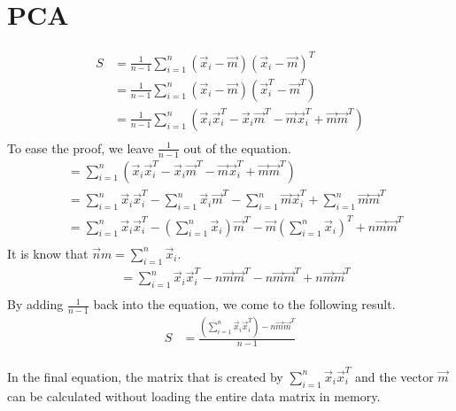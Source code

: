 \documentclass[a4paper,12px]{article}
\begin{document}
\section{PCA}

\begin{equation}
\begin{aligned}
S &= \frac{1}{n-1} \sum\limits_{i=1}^{n} (\vec x_i - \vec m)(\vec x_i - \vec m)^T\\
  &= \frac{1}{n-1} \sum\limits_{i=1}^{n} (\vec x_i - \vec m)(\vec x_i^T - \vec m^T)\\
  &= \frac{1}{n-1} \sum\limits^n_{i=1} \left(\vec x_i \vec x_i^T - \vec x_i \vec m^T -
                                             \vec m \vec x_i^T + \vec m \vec m ^T\right) \\
\end{aligned}
\end{equation}
To ease the proof, we leave $\frac{1}{n-1}$ out of the equation.
\begin{equation}
\begin{aligned}
  &= \sum\limits^n_{i=1} \left(\vec x_i \vec x_i^T - \vec x_i \vec m^T - \vec m \vec
    x_i^T + \vec m \vec m^T\right)\\
  &= \sum\limits^n_{i=1} \vec x_i \vec x_i^T - \sum\limits^n_{i=1} \vec x_i \vec m^T - \sum\limits^n_{i=1} \vec m \vec
    x_i^T + \sum\limits^n_{i=1} \vec m \vec m^T \\
  &= \sum\limits^n_{i=1} \vec x_i \vec x_i^T - \left(\sum\limits^n_{i=1} \vec x_i\right)
    \vec m^T - \vec m \left(\sum\limits^n_{i=1} \vec x_i\right)^T + n \vec m \vec m^T\\
\end{aligned}
\end{equation}
It is know that $\vec nm = \sum\limits_{i=1}^n \vec x_i$.
\begin{equation}
\begin{aligned}
    &= \sum\limits^n_{i=1} \vec x_i \vec x_i^T - n \vec m \vec m^T - n \vec m \vec
    m^T + n \vec m \vec m^T \\
\end{aligned}
\end{equation}
By adding $\frac{1}{n-1}$ back into the equation, we come to the following result.
\begin{equation}
\begin{aligned}
    S &= \frac{\left(\sum\limits^n_{i=1} \vec x_i \vec x_i^T \right) - n \vec m \vec m^T}{n-1} \\
\end{aligned}
\end{equation}

In the final equation, the matrix that is created by $\sum\limits_{i=1}^n \vec
x_i \vec x_i^T$ and the vector $\vec m$ can be calculated without loading the
entire data matrix in memory.



% 
% 
\end{document}
